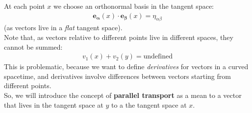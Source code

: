 \documentclass[../template.tex]{subfiles}
\begin{document}
At each point $x$ we choose an orthonormal basis in the tangent space:
\begin{align*}
    \bm{e_\alpha}(x) \cdot \bm{e_\beta}(x) = \eta_{\alpha \beta}
\end{align*} 
(as vectors live in a \textit{flat} tangent space).\\
Note that, as vectors relative to different points live in different spaces, they cannot be summed:
\begin{align*}
    v_1(x) + v_2(y) = \text{undefined}
\end{align*}
This is problematic, because we want to define \textit{derivatives} for vectors in a curved spacetime, and derivatives involve differences between vectors starting from different points.\\
So, we will introduce the concept of \textbf{parallel transport} as a mean to  a vector that lives in the tangent space at $y$ to a the tangent space at $x$.
    
\end{document}
